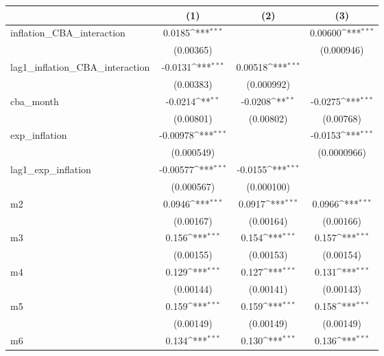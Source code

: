 {
\def\sym#1{\ifmmode^{#1}\else\(^{#1}\)\fi}
\begin{tabular}{l*{3}{c}}
\hline\hline
            &\multicolumn{1}{c}{(1)}         &\multicolumn{1}{c}{(2)}         &\multicolumn{1}{c}{(3)}         \\
\hline
inflation\_CBA\_interaction&      0.0185\sym{***}&                     &     0.00600\sym{***}\\
            &   (0.00365)         &                     &  (0.000946)         \\
lag1\_inflation\_CBA\_interaction&     -0.0131\sym{***}&     0.00518\sym{***}&                     \\
            &   (0.00383)         &  (0.000992)         &                     \\
cba\_month   &     -0.0214\sym{**} &     -0.0208\sym{**} &     -0.0275\sym{***}\\
            &   (0.00801)         &   (0.00802)         &   (0.00768)         \\
exp\_inflation&    -0.00978\sym{***}&                     &     -0.0153\sym{***}\\
            &  (0.000549)         &                     & (0.0000966)         \\
lag1\_exp\_inflation&    -0.00577\sym{***}&     -0.0155\sym{***}&                     \\
            &  (0.000567)         &  (0.000100)         &                     \\
m2          &      0.0946\sym{***}&      0.0917\sym{***}&      0.0966\sym{***}\\
            &   (0.00167)         &   (0.00164)         &   (0.00166)         \\
m3          &       0.156\sym{***}&       0.154\sym{***}&       0.157\sym{***}\\
            &   (0.00155)         &   (0.00153)         &   (0.00154)         \\
m4          &       0.129\sym{***}&       0.127\sym{***}&       0.131\sym{***}\\
            &   (0.00144)         &   (0.00141)         &   (0.00143)         \\
m5          &       0.159\sym{***}&       0.159\sym{***}&       0.158\sym{***}\\
            &   (0.00149)         &   (0.00149)         &   (0.00149)         \\
m6          &       0.134\sym{***}&       0.130\sym{***}&       0.136\sym{***}\\

\end{tabular}}
